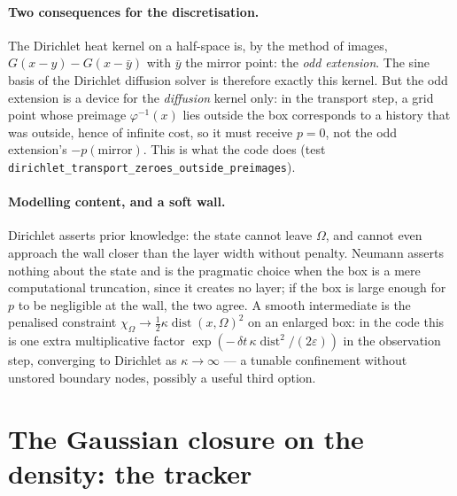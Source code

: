 \documentclass[11pt,a4paper]{article}
\newcommand{\eps}{\varepsilon}
\newcommand{\dt}{\,\delta t}
\theoremstyle{plain}
\theoremstyle{definition}
\theoremstyle{remark}
\begin{document}
\paragraph{Two consequences for the discretisation.}
The Dirichlet heat kernel on a half-space is, by the method of images, $G(x-y)-G(x-\bar y)$ with $\bar y$ the mirror point: the \emph{odd extension}. The sine basis of the Dirichlet diffusion solver is therefore exactly this kernel. But the odd extension is a device for the \emph{diffusion} kernel only: in the transport step, a grid point whose preimage $\varphi^{-1}(x)$ lies outside the box corresponds to a history that was outside, hence of infinite cost, so it must receive $p=0$, not the odd extension's $-p(\text{mirror})$. This is what the code does (test \texttt{dirichlet\_transport\_zeroes\_outside\_preimages}).

\paragraph{Modelling content, and a soft wall.}
Dirichlet asserts prior knowledge: the state cannot leave $\Omega$, and cannot even approach the wall closer than the layer width without penalty. Neumann asserts nothing about the state and is the pragmatic choice when the box is a mere computational truncation, since it creates no layer; if the box is large enough for $p$ to be negligible at the wall, the two agree. A smooth intermediate is the penalised constraint $\chi_\Omega \to \tfrac12\kappa\operatorname{dist}(x,\Omega)^2$ on an enlarged box: in the code this is one extra multiplicative factor $\exp(-\dt\,\kappa\operatorname{dist}^2/(2\eps))$ in the observation step, converging to Dirichlet as $\kappa\to\infty$ --- a tunable confinement without unstored boundary nodes, possibly a useful third option.

\section{The Gaussian closure on the density: the tracker}
\label{sec:tracker}
\end{document}
